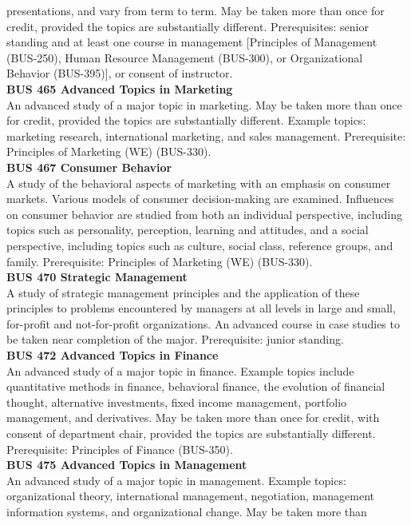 \documentclass[
  letterpaper,
]{scrbook}
\begin{document}
presentations, and vary from term to term. May be taken more than once
for credit, provided the topics are substantially different.
Prerequisites: senior standing and at least one course in management
{[}Principles of Management (BUS-250), Human Resource Management
(BUS-300), or Organizational Behavior (BUS-395){]}, or consent of
instructor.\\
\textbf{BUS 465 Advanced Topics in Marketing}\\
An advanced study of a major topic in marketing. May be taken more than
once for credit, provided the topics are substantially different.
Example topics: marketing research, international marketing, and sales
management. Prerequisite: Principles of Marketing (WE) (BUS-330).\\
\textbf{BUS 467 Consumer Behavior}\\
A study of the behavioral aspects of marketing with an emphasis on
consumer markets. Various models of consumer decision-making are
examined. Influences on consumer behavior are studied from both an
individual perspective, including topics such as personality,
perception, learning and attitudes, and a social perspective, including
topics such as culture, social class, reference groups, and family.
Prerequisite: Principles of Marketing (WE) (BUS-330).\\
\textbf{BUS 470 Strategic Management}\\
A study of strategic management principles and the application of these
principles to problems encountered by managers at all levels in large
and small, for-profit and not-for-profit organizations. An advanced
course in case studies to be taken near completion of the major.
Prerequisite: junior standing.\\
\textbf{BUS 472 Advanced Topics in Finance}\\
An advanced study of a major topic in finance. Example topics include
quantitative methods in finance, behavioral finance, the evolution of
financial thought, alternative investments, fixed income management,
portfolio management, and derivatives. May be taken more than once for
credit, with consent of department chair, provided the topics are
substantially different. Prerequisite: Principles of Finance
(BUS-350).\\
\textbf{BUS 475 Advanced Topics in Management}\\
An advanced study of a major topic in management. Example topics:
organizational theory, international management, negotiation, management
information systems, and organizational change. May be taken more than
\end{document}
